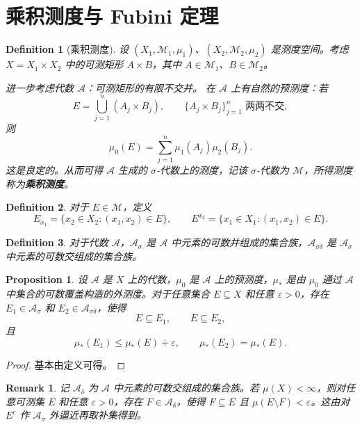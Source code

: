 \documentclass[12pt,letterpaper,twoside,openright]{ctexbook}
\theoremstyle{bluehead}
\newtheorem{proposition}[theorem]{Proposition}
\theoremstyle{olivehead}
\newtheorem{definition}{Definition}
\theoremstyle{orangehead}
\theoremstyle{redremark}
\newtheorem*{remark}{Remark}
\begin{document}
\section{乘积测度与 Fubini 定理}

\begin{definition}[乘积测度]
设 $(X_1,\mathcal{M}_1,\mu_1)$、$(X_2,\mathcal{M}_2,\mu_2)$ 是测度空间。考虑 $X=X_1\times X_2$ 中的可测矩形 $A\times B$，其中 $A\in\mathcal{M}_1$、$B\in\mathcal{M}_2$。

进一步考虑代数 $\mathcal{A}$：可测矩形的有限不交并。
在 $\mathcal{A}$ 上有自然的预测度：若
\[
  E=\bigcup_{j=1}^{n}(A_j\times B_j),
  \qquad\{A_j\times B_j\}_{j=1}^{n}\text{ 两两不交},
\]
则
\[
  \mu_0(E)=\sum_{j=1}^{n}\mu_1(A_j)\mu_2(B_j).
\]
这是良定的。从而可得 $\mathcal{A}$ 生成的 $\sigma$-代数上的测度，记该 $\sigma$-代数为 $\mathcal{M}$，所得测度称为\textbf{乘积测度}。
\end{definition}

\begin{definition}
对于 $E\in\mathcal{M}$，定义
\[
  E_{x_1}=\{x_2\in X_2:(x_1,x_2)\in E\},
  \qquad
  E^{x_2}=\{x_1\in X_1:(x_1,x_2)\in E\}.
\]
\end{definition}
\begin{definition}
对于代数 $\mathcal{A}$，$\mathcal{A}_\sigma$ 是 $\mathcal{A}$ 中元素的可数并组成的集合族，$\mathcal{A}_{\sigma\delta}$ 是 $\mathcal{A}_\sigma$ 中元素的可数交组成的集合族。
\end{definition}
\begin{proposition}
设 $\mathcal{A}$ 是 $X$ 上的代数，$\mu_0$ 是 $\mathcal{A}$ 上的预测度，$\mu_*$ 是由 $\mu_0$ 通过 $\mathcal{A}$ 中集合的可数覆盖构造的外测度。对于任意集合 $E\subseteq X$ 和任意 $\varepsilon>0$，存在 $E_1\in\mathcal{A}_\sigma$ 和 $E_2\in\mathcal{A}_{\sigma\delta}$，使得
\[
  E\subseteq E_1,\qquad E\subseteq E_2,
\]
且
\[
  \mu_*(E_1)\leq\mu_*(E)+\varepsilon,\qquad
  \mu_*(E_2)=\mu_*(E).
\]
\end{proposition}

\begin{proof}
基本由定义可得。
\end{proof}
\begin{remark}
记 $\mathcal A_\delta$ 为 $\mathcal A$ 中元素的可数交组成的集合族。若 $\mu(X)<\infty$，则对任意可测集 $E$ 和任意 $\varepsilon>0$，存在 $F\in\mathcal A_\delta$，使得 $F\subseteq E$ 且 $\mu(E\setminus F)<\varepsilon$。这由对 $E^c$ 作 $\mathcal A_\sigma$ 外逼近再取补集得到。
\end{remark}
\end{document}
